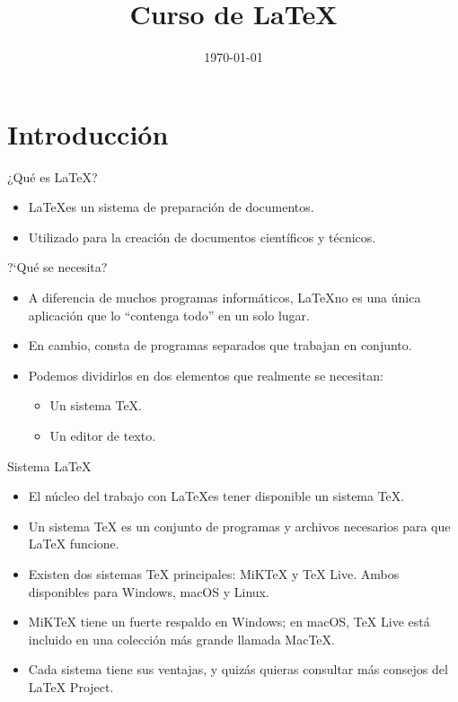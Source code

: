 \documentclass[12]{beamer}
\title{Curso de \LaTeX}
\date{\today}
\begin{document}
\frame{\titlepage}

\frame{\tableofcontents}
\section{Introducción}
\begin{frame}{¿Qu\'e es \LaTeX?}
  \begin{itemize}
    \item \LaTeX es un sistema de preparaci\'on de documentos.
    \item<2-> Utilizado para la creaci\'on de documentos cient\'ificos y t\'ecnicos.
  \end{itemize}
\end{frame}
\begin{frame}{?`Qu\'e se necesita?}
  \begin{itemize}
    \item A diferencia de muchos programas inform\'aticos, \LaTeX no es una \'unica aplicaci\'on que lo ``contenga todo'' en un solo lugar.
    \item<2-> En cambio, consta de programas separados que trabajan en conjunto.
    \item<3-> Podemos dividirlos en dos elementos que realmente se necesitan:
    \begin{itemize}
      \item<4-> Un sistema TeX.
      \item<5-> Un editor de texto.
    \end{itemize}
  \end{itemize}  
\end{frame}
\begin{frame}{Sistema \LaTeX}
  \begin{itemize}
    \item El n\'ucleo del trabajo con \LaTeX es tener disponible un sistema TeX. 
    \item Un sistema TeX es un conjunto de programas y archivos necesarios para que LaTeX funcione.
    \item Existen dos sistemas TeX principales: MiKTeX y TeX Live. Ambos disponibles para Windows, macOS y Linux.
    \item MiKTeX tiene un fuerte respaldo en Windows; en macOS, TeX Live está incluido en una colecci\'on m\'as grande llamada MacTeX.
    \item Cada sistema tiene sus ventajas, y quizás quieras consultar más consejos del LaTeX Project.    
  \end{itemize}
\end{frame}
\end{document}
